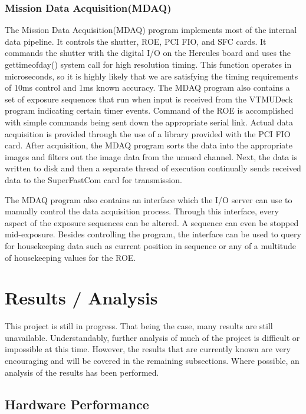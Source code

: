 \documentclass[11pt,titlepage]{article}
\begin{document}
\subsubsection{Mission Data Acquisition(MDAQ)}
The Mission Data Acquisition(MDAQ) program implements most of the internal data pipeline. It controls the shutter, ROE, PCI FIO, and SFC cards. It 
commands the shutter with the digital I/O on the Hercules board and uses the gettimeofday() system call for high resolution timing. This function 
operates in microseconds, so it is highly likely that we are satisfying the timing requirements of 10ms control and 1ms known accuracy. The MDAQ program
also contains a set of exposure sequences that run when input is received from the VTMUDeck program indicating certain timer events. Command of the
ROE is accomplished with simple commands being sent down the appropriate serial link. Actual data acquisition is provided through the use of a library
provided with the PCI FIO card. After acquisition, the MDAQ program sorts the data into the appropriate images and filters out the image data from the
unused channel. Next, the data is written to disk and then a separate thread of execution continually sends received data to the SuperFastCom card for
transmission. 

The MDAQ program also contains an interface which the I/O server can use to manually control the data acquisition process. Through this interface, 
every aspect of the exposure sequences can be altered. A sequence can even be stopped mid-exposure. Besides controlling the program, the interface
can be used to query for housekeeping data such as current position in sequence or any of a multitude of housekeeping values for the ROE.
 
\section{Results / Analysis}

This project is still in progress. That being the case, many results are still unavailable. 
Understandably, further analysis of much of the project is difficult or impossible at this time. However, the
results that are currently known are very encouraging and will be covered in the remaining subsections. Where possible, an analysis 
of the results has been performed. 

\subsection{Hardware Performance}
\end{document}

